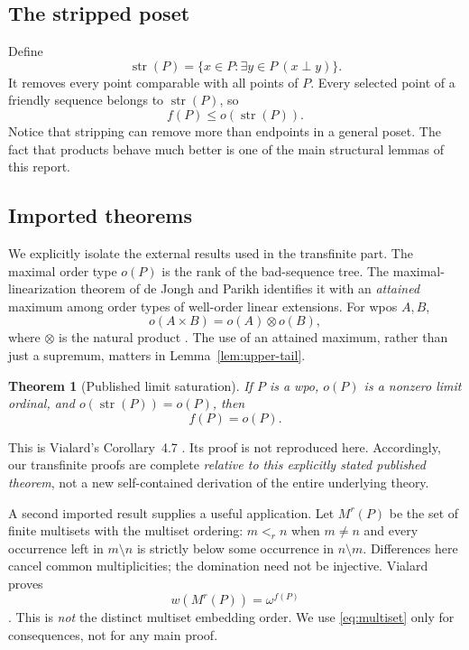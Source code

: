 \documentclass[11pt,letterpaper]{article}
\newtheorem{theorem}{Theorem}[section]
\theoremstyle{definition}
\theoremstyle{remark}
\newcommand{\str}{\operatorname{str}}
\begin{document}
\subsection{The stripped poset}
Define
\[
 \str(P)=\{x\in P:\exists y\in P\ (x\perp y)\}.
\]
It removes every point comparable with all points of $P$. Every selected
point of a friendly sequence belongs to $\str(P)$, so
\begin{equation}\label{eq:strip-upper}
 f(P)\le o(\str(P)).
\end{equation}
Notice that stripping can remove more than endpoints in a general poset.
The fact that products behave much better is one of the main structural
lemmas of this report.

\subsection{Imported theorems}
We explicitly isolate the external results used in the transfinite part.
The maximal order type $o(P)$ is the rank of the bad-sequence tree. The
maximal-linearization theorem of de Jongh and Parikh identifies it with an
\emph{attained} maximum among order types of well-order linear extensions.
For wpos $A,B$,
\begin{equation}\label{eq:mot-product}
 o(A\times B)=o(A)\otimes o(B),
\end{equation}
where $\otimes$ is the natural product \cite{DeJonghParikh}.
The use of an attained maximum, rather than just a supremum, matters in
Lemma~\ref{lem:upper-tail}.

\begin{theorem}[Published limit saturation]\label{thm:imported-limit}
If $P$ is a wpo, $o(P)$ is a nonzero limit ordinal, and
$o(\str(P))=o(P)$, then
\[
 f(P)=o(P).
\]
\end{theorem}
This is Vialard's Corollary~4.7 \cite{Vialard2023}. Its proof is not
reproduced here. Accordingly, our transfinite proofs are complete
\emph{relative to this explicitly stated published theorem}, not a new
self-contained derivation of the entire underlying theory.

A second imported result supplies a useful application. Let $M^r(P)$ be
the set of finite multisets with the multiset ordering: $m<_r n$ when
$m\ne n$ and every occurrence left in $m\setminus n$ is strictly below
some occurrence in $n\setminus m$. Differences here cancel common
multiplicities; the domination need not be injective. Vialard proves
\begin{equation}\label{eq:multiset}
 w(M^r(P))=\omega^{f(P)}
\end{equation}
\cite[Theorem~3.4]{Vialard2023}. This is \emph{not} the distinct multiset
embedding order. We use \eqref{eq:multiset} only for consequences, not for
any main proof.
\end{document}
